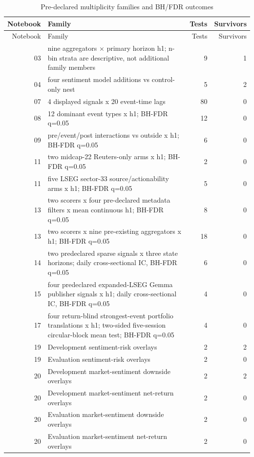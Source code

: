 \begingroup
\small
\begin{longtable}{r p{9.2cm} rr}
\caption{Pre-declared multiplicity families and BH/FDR outcomes}
\label{tab:multiplicity-families} \\
\toprule
Notebook & Family & Tests & Survivors \\
\midrule
\endfirsthead
\toprule
Notebook & Family & Tests & Survivors \\
\midrule
\endhead
03 & nine aggregators × primary horizon h1; n-bin strata are descriptive, not additional family members & 9 & 1 \\
04 & four sentiment model additions vs control-only nest & 5 & 2 \\
07 & 4 displayed signals x 20 event-time lags & 80 & 0 \\
08 & 12 dominant event types x h1; BH-FDR q=0.05 & 12 & 0 \\
09 & pre/event/post interactions vs outside x h1; BH-FDR q=0.05 & 6 & 0 \\
11 & two midcap-22 Reuters-only arms x h1; BH-FDR q=0.05 & 2 & 0 \\
11 & five LSEG sector-33 source/actionability arms x h1; BH-FDR q=0.05 & 5 & 0 \\
13 & two scorers x four pre-declared metadata filters x mean continuous h1; BH-FDR q=0.05 & 8 & 0 \\
13 & two scorers x nine pre-existing aggregators x h1; BH-FDR q=0.05 & 18 & 0 \\
14 & two predeclared sparse signals x three state horizons; daily cross-sectional IC, BH-FDR q=0.05 & 6 & 0 \\
15 & four predeclared expanded-LSEG Gemma publisher signals x h1; daily cross-sectional IC, BH-FDR q=0.05 & 4 & 0 \\
17 & four return-blind strongest-event portfolio translations x h1; two-sided five-session circular-block mean test; BH-FDR q=0.05 & 4 & 0 \\
19 & Development sentiment-risk overlays & 2 & 2 \\
19 & Evaluation sentiment-risk overlays & 2 & 0 \\
20 & Development market-sentiment downside overlays & 2 & 2 \\
20 & Development market-sentiment net-return overlays & 2 & 0 \\
20 & Evaluation market-sentiment downside overlays & 2 & 0 \\
20 & Evaluation market-sentiment net-return overlays & 2 & 0 \\

\end{longtable}
